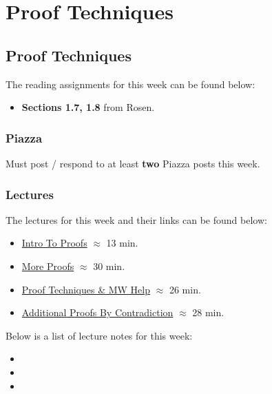 \clearpage

\renewcommand{\ChapTitle}{Proof Techniques}
\renewcommand{\SectionTitle}{Proof Techniques}

\chapter{\ChapTitle}
\section{\SectionTitle}

The reading assignments for this week can be found below:

\begin{itemize}
    \item \textbf{Sections 1.7, 1.8} from Rosen.
\end{itemize}

\subsection{Piazza}

Must post / respond to at least \textbf{two} Piazza posts this week.  

\subsection{Lectures}

The lectures for this week and their links can be found below:

\begin{itemize}
    \item \href{https://drive.explaineverything.com/thecode/TREJHHM}{Intro To Proofs} $\approx$ 13 min.
    \item \href{https://drive.explaineverything.com/thecode/YNUCFDU}{More Proofs} $\approx$ 30 min.
    \item \href{https://drive.explaineverything.com/thecode/UAQXMXM}{Proof Techniques \& MW Help} $\approx$ 26 min.
    \item \href{https://applied.cs.colorado.edu/mod/hvp/view.php?id=51592}{Additional Proofs By Contradiction} $\approx$ 28 min.
\end{itemize}

\noindent Below is a list of lecture notes for this week:

\begin{itemize}
    \item {}
    \item {}
    \item {}
\end{itemize}

